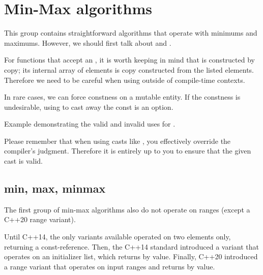 \section{Min-Max algorithms}

This group contains straightforward algorithms that operate with minimums and maximums. However, we should first talk about  and .

For functions that accept an , it is worth keeping in mind that  is constructed by copy; its internal array of elements is copy constructed from the listed elements. Therefore we need to be careful when using  outside of compile-time contexts.

In rare cases, we can force constness on a mutable entity. If the constness is undesirable, using  to cast away the const is an option.

\begin{box-note}
\footnotesize Example demonstrating the valid and invalid uses for .
\tcblower
{}
\end{box-note}

Please remember that when using casts like , you effectively override the compiler's judgment. Therefore it is entirely up to you to ensure that the given cast is valid.

\subsection{min, max, minmax}

The first group of min-max algorithms also do not operate on ranges (except a C++20 range variant).



Until C++14, the only variants available operated on two elements only, returning a const-reference. Then, the C++14 standard introduced a variant that operates on an initializer list, which returns by value. Finally, C++20 introduced a range variant that operates on input ranges and returns by value.

